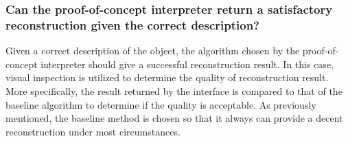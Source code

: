 






\subsubsection{Can the proof-of-concept interpreter return a satisfactory reconstruction given the correct description?}
Given a correct description of the object, the algorithm chosen by the proof-of-concept interpreter should give a successful reconstruction result. In this case, visual inspection is utilized to determine the quality of reconstruction result. More specifically, the result returned by the interface is compared to that of the baseline algorithm to determine if the quality is acceptable. As previously mentioned, the baseline method is chosen so that it always can provide a decent reconstruction under most circumstances.

